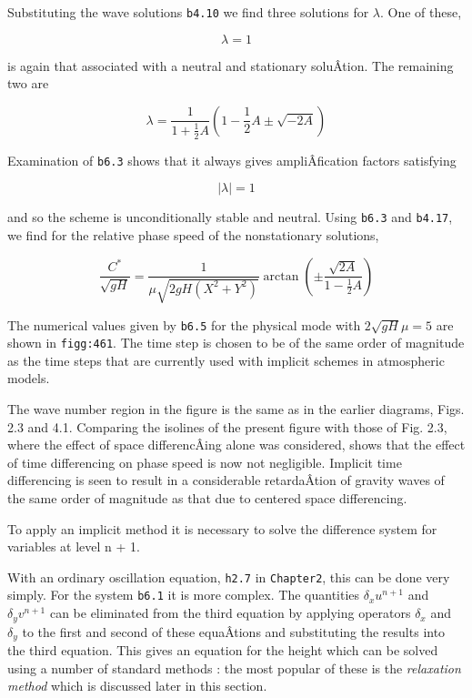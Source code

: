Substituting the wave solutions \texttt{b4.10} we find three solutions
for \(\lambda\). One of these,

{\[\lambda = 1\]}

is again that associated with a neutral and stationary soluÂ­tion. The
remaining two are

{\[\lambda = \frac{1}{1 + \frac{1}{2}A}\left( 1 - \frac{1}{2}A \pm \sqrt{- 2A} \right)\]}

Examination of \texttt{b6.3} shows that it always gives ampliÂ­fication
factors satisfying

{\[\left| \lambda \right| = 1\]}

and so the scheme is unconditionally stable and neutral. Using
\texttt{b6.3} and \texttt{b4.17}, we find for the relative phase speed
of the nonstationary solutions,

{\[\frac{C^{*}}{\sqrt{gH}} = \frac{1}{\mu\sqrt{2gH(X^{2} + Y^{2})}}\arctan{( \pm \frac{\sqrt{2A}}{1 - \frac{1}{2}A} )}\]}

The numerical values given by \texttt{b6.5} for the physical mode with
\(2\sqrt{gH}\mu = 5\) are shown in \texttt{figg:461}. The time step is
chosen to be of the same order of magnitude as the time steps that are
currently used with implicit schemes in atmospheric models.

\begin{figure}
\centering
{}
\caption{}
\end{figure}

The wave number region in the figure is the same as in the earlier
diagrams, Figs. 2.3 and 4.1. Comparing the isolines of the present
figure with those of Fig. 2.3, where the effect of space differencÂ­ing
alone was considered, shows that the effect of time differencing on
phase speed is now not negligible. Implicit time differencing is seen to
result in a considerable retardaÂ­tion of gravity waves of the same order
of magnitude as that due to centered space differencing.

To apply an implicit method it is necessary to solve the difference
system for variables at level n + 1.

With an ordinary oscillation equation, \texttt{h2.7} in
\texttt{Chapter2}, this can be done very simply. For the system
\texttt{b6.1} it is more complex. The quantities \(\delta_{x}u^{n + 1}\)
and \(\delta_{y}v^{n + 1}\) can be eliminated from the third equation by
applying operators \(\delta_{x}\) and \(\delta_{y}\) to the first and
second of these equaÂ­tions and substituting the results into the third
equation. This gives an equation for the height which can be solved
using a number of standard methods : the most popular of these is the
\emph{relaxation method} which is discussed later in this section.


